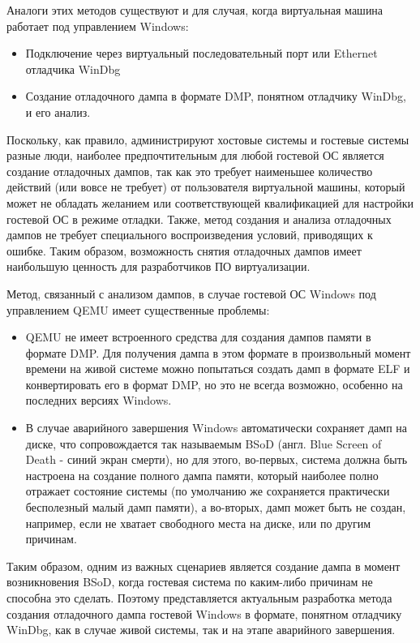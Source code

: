 \documentclass{mipt-thesis-bs}
\begin{document}
Аналоги этих методов существуют и для случая, когда виртуальная машина работает под управлением Windows:

\begin{itemize}
\item Подключение через виртуальный последовательный порт или Ethernet отладчика WinDbg
\item Создание отладочного дампа в формате DMP, понятном отладчику WinDbg, и его анализ.
\end{itemize}

Поскольку, как правило, администрируют хостовые системы и гостевые системы разные люди, наиболее предпочтительным для любой гостевой ОС является создание отладочных дампов, так как это требует наименьшее количество действий (или вовсе не требует) от пользователя виртуальной машины, который может не обладать желанием или соответствующей квалификацией для настройки гостевой ОС в режиме отладки. Также, метод создания и анализа отладочных дампов не требует специального воспроизведения условий, приводящих к ошибке. Таким образом, возможность снятия отладочных дампов имеет наибольшую ценность для разработчиков ПО виртуализации.

Метод, связанный с анализом дампов, в случае гостевой ОС Windows под управлением QEMU имеет существенные проблемы:

\begin{itemize}
\item QEMU не имеет встроенного средства для создания дампов памяти в формате DMP. Для получения дампа в этом формате в произвольный момент времени на живой системе можно попытаться создать дамп в формате ELF и конвертировать его в формат DMP, но это не всегда возможно, особенно на последних версиях Windows.
\item В случае аварийного завершения Windows автоматически сохраняет дамп на диске, что сопровождается так называемым BSoD (англ. Blue Screen of Death - синий экран смерти), но для этого, во-первых, система должна быть настроена на создание полного дампа памяти, который наиболее полно отражает состояние системы (по умолчанию же сохраняется практически бесполезный малый дамп памяти), а во-вторых, дамп может быть не создан, например, если не хватает свободного места на диске, или по другим причинам\cite{nodump}.
\end{itemize}

Таким образом, одним из важных сценариев является создание дампа в момент возникновения BSoD, когда гостевая система по каким-либо причинам не способна это сделать. Поэтому представляется актуальным разработка метода создания отладочного дампа гостевой Windows в формате, понятном отладчику WinDbg, как в случае живой системы, так и на этапе аварийного завершения.
\end{document}
